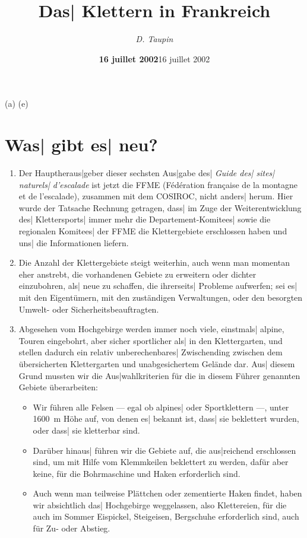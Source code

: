 \documentclass[12pt]{article}
\def\ital#1{{\slshape #1\/}}
\def\FFME{{\SetCmDefault\rm FFME{}}}
\def\COSIROC{{\SetCmDefault\rm COSIROC{}}}
\begin{document}
\german


\title{\Large\bf Das| Klettern in Frankreich}
\author{\SetCmDefault\sl D. Taupin}
\date{{\SetCmDefault\bf 16 juillet 2002}}
\date{{\SetCmDefault\rm 16 juillet 2002}}
\maketitle

{\huge (a) (e)}

\section{Was| gibt es| neu?} \rm

\begin{enumerate}
 \item Der Hauptheraus|geber dieser sechsten Aus|gabe des| \ital{Guide des|
sites| naturels| d'escalade} ist jetzt die \FFME{} (F\'ed\'eration fran\c
caise de la montagne et de l'escalade), zusammen mit dem \COSIROC, nicht
anders| herum. Hier wurde der Tatsache Rechnung getragen, das{}s| im Zuge der
Weiterentwicklung des| Klettersports| immer mehr die Departement-Komitees|
sowie die regionalen Komitees| der \FFME{} die Klettergebiete erschlossen
haben und uns| die Informationen liefern.

 \item Die Anzahl der Klettergebiete steigt weiterhin, auch wenn man momentan
eher anstrebt, die vorhandenen Gebiete zu erweitern oder dichter einzubohren,
als| neue zu schaffen, die ihrerseits| Probleme aufwerfen; sei es| mit den
Eigent\"umern, mit den zust\"andigen Verwaltungen, oder den besorgten Umwelt-
oder Sicherheitsbeauftragten.

 \item Abgesehen vom Hochgebirge werden immer noch viele, einstmals| alpine,
Touren eingebohrt, aber sicher sportlicher als| in den Klettergarten, und
stellen dadurch ein relativ unberechenbares| Zwischending zwischen dem
\"ubersicherten Klettergarten und unabgesichertem Gel\"ande dar. Aus| diesem
Grund mussten wir die Aus|wahlkriterien f\"ur die in diesem F\"uhrer genannten
Gebiete \"uberarbeiten:
 \begin{itemize}
 \item Wir f\"uhren alle Felsen --- egal ob alpines| oder Sportklettern ---,
unter 1600~m H\"ohe auf, von denen es| bekannt ist, das{}s| sie beklettert wurden,
oder das{}s| sie kletterbar sind.
 \item Dar\"uber hinaus| f\"uhren wir die Gebiete auf, die aus|reichend
erschlossen sind, um mit Hilfe vom Klemmkeilen beklettert zu werden, daf\"ur
aber keine, f\"ur die Bohrmaschine und Haken erforderlich sind.
 \item Auch wenn man teilweise Pl\"attchen oder zementierte Haken findet, haben
wir absichtlich das| Hochgebirge weggelassen, also Klettereien, f\"ur die auch im
Sommer Eispickel, Steigeisen, Bergschuhe erforderlich sind, auch f\"ur Zu- oder
Abstieg.


\end{itemize}
\end{enumerate}
\end{document}
